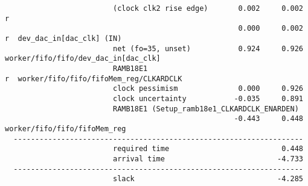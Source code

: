 \documentclass{article}
\begin{document}
\begin{lstlisting}
                         (clock clk2 rise edge)       0.002     0.002 r  
                                                      0.000     0.002 r  dev_dac_in[dac_clk] (IN)
                         net (fo=35, unset)           0.924     0.926    worker/fifo/fifo/dev_dac_in[dac_clk]
                         RAMB18E1                                     r  worker/fifo/fifo/fifoMem_reg/CLKARDCLK
                         clock pessimism              0.000     0.926    
                         clock uncertainty           -0.035     0.891    
                         RAMB18E1 (Setup_ramb18e1_CLKARDCLK_ENARDEN)
                                                     -0.443     0.448    worker/fifo/fifo/fifoMem_reg
  -------------------------------------------------------------------
                         required time                          0.448    
                         arrival time                          -4.733    
  -------------------------------------------------------------------
                         slack                                 -4.285    




\end{lstlisting}
\end{document}
